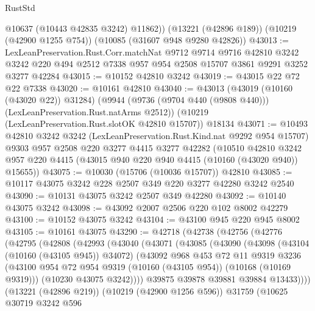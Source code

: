 \begin{lexlean}{RustStd}
\begin{coremodule}
        @10637
        (@10443 @42835 @3242)
        @11862))
    (@13221 (@42896 @189))
    (@10219 (@42900 @1255 @754))
    (@10085 (@31607 @948 @9280 @42826))
@43013 := LexLeanPreservation.Rust.Corr.matchNat
    @9712
    @9714
    @9716
    @42810
    @3242
    @3242
    @220
    @494
    @2512
    @7338
    @957
    @954
    @2508
    @15707
    @3861
    @9291
    @3252
    @3277
    @42284
@43015 := @10152 @42810 @3242
@43019 := @43015 @22 @72 @22 @7338
@43020 := @10161 @42810
@43040 := @43013
    (@43019 (@10160 (@43020 @22)) @31284)
    (@9944 (@9736 (@9704 @440 (@9808 @440))) (LexLeanPreservation.Rust.natArms @2512))
    (@10219 (LexLeanPreservation.Rust.slotOK @42810 @15707))
    @18134
@43071 := @10493
    @42810
    @3242
    @3242
    (LexLeanPreservation.Rust.Kind.nat @9292 @954 @15707)
    @9303
    @957
    @2508
    @220
    @3277
    @4415
    @3277
    @42282
    (@10510
      @42810
      @3242
      @957
      @220
      @4415
      (@43015 @940 @220 @940 @4415 (@10160 (@43020 @940)) @15655))
@43075 := @10030 (@15706 (@10036 @15707)) @42810
@43085 := @10117 @43075 @3242 @228 @2507 @349 @220 @3277 @42280 @3242 @2540
@43090 := @10131 @43075 @3242 @2507 @349 @42280
@43092 := @10140 @43075 @3242
@43098 := @43092 @2007 @2506 @220 @102 @8002 @42279
@43100 := @10152 @43075 @3242
@43104 := @43100 @945 @220 @945 @8002
@43105 := @10161 @43075
@43290 := @42718
    (@42738
      (@42756
        (@42776
          (@42795
            (@42808
              (@42993
                (@43040
                  (@43071
                    (@43085
                      (@43090
                        (@43098
                          (@43104 (@10160 (@43105 @945)) @34072)
                          (@43092
                            @968
                            @453
                            @72
                            @11
                            @9319
                            @3236
                            (@43100
                              @954
                              @72
                              @954
                              @9319
                              (@10160 (@43105 @954))
                              (@10168 (@10169 @9319)))
                            (@10230 @43075 @3242))))
                      @39875
                      @39878
                      @39881
                      @39884
                      @13433))))
              (@13221 (@42896 @219))
              (@10219 (@42900 @1256 @596))
              @31759
              (@10625
                @30719
                @3242
                @596

\end{coremodule}
\end{lexlean}
